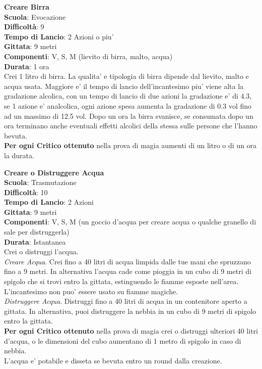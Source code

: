 \begin{multicols}{2}
\medskip\textbf{Creare Birra}\\
\textbf{Scuola}: Evocazione\\
\textbf{Difficoltà}: 9\\
\textbf{Tempo di Lancio}: 2 Azioni o piu'\\
\textbf{Gittata}: 9 metri\\
\textbf{Componenti}: V, S, M (lievito di birra, malto, acqua)\\
\textbf{Durata}: 1 ora\\
Crei 1 litro di birra. La qualita' e tipologia di birra dipende dal lievito, malto e acqua usata.
Maggiore e' il tempo di lancio dell'incantesimo piu' viene alta la gradazione alcolica, con un tempo di lancio di due azioni la gradazione e' di 4.3, se 1 azione e' analcolica, ogni azione spesa aumenta la gradazione di 0.3 vol fino ad un massimo di 12.5 vol.
Dopo un ora la birra svanisce, se consumata dopo un ora terminano anche eventuali effetti alcolici della stessa sulle persone che l'hanno bevuta.\\
\textbf{Per ogni Critico ottenuto} nella prova di magia aumenti di un litro o di un ora la durata.

\medskip\textbf{Creare o Distruggere Acqua}\\
\textbf{Scuola}: Trasmutazione\\
\textbf{Difficoltà}: 10\\
\textbf{Tempo di Lancio}: 2 Azioni\\
\textbf{Gittata}: 9 metri\\
\textbf{Componenti}: V, S, M (un goccio d'acqua per creare acqua o qualche granello di sale per distruggerla)\\
\textbf{Durata}: Istantanea\\
Crei o distruggi l'acqua.\\
\textit{Creare Acqua}. Crei fino a 40 litri di acqua limpida dalle tue mani che spruzzano fino a 9 metri. In alternativa l'acqua cade come pioggia in un cubo di 9 metri di spigolo che si trovi entro la gittata, estinguendo le fiamme esposte nell'area.\\
L'incantesimo non puo' essere usato su fiamme magiche.\\
\textit{Distruggere Acqua}. Distruggi fino a 40 litri di acqua in un contenitore aperto a gittata. In alternativa, puoi distruggere la nebbia in un cubo di 9 metri di spigolo entro la gittata.\\
\textbf{Per ogni Critico ottenuto} nella prova di magia crei o distruggi ulteriori 40 litri d'acqua, o le dimensioni del cubo aumentano di 1 metro di spigolo in caso di nebbia.\\
L'acqua e' potabile e disseta se bevuta entro un round dalla creazione.


\end{multicols}
